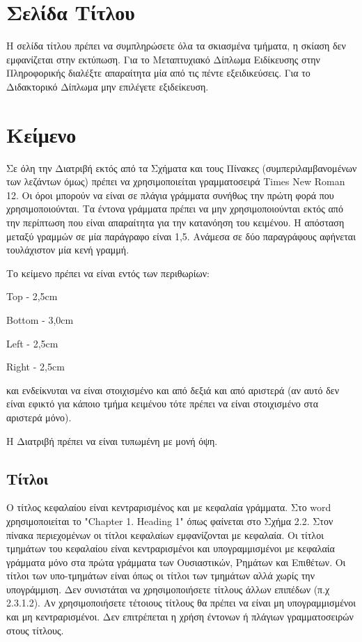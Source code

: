 \section{Σελίδα Τίτλου}
\label{sec:2.2}

Η σελίδα τίτλου πρέπει να συμπληρώσετε όλα τα σκιασμένα τμήματα, η
σκίαση δεν εμφανίζεται στην εκτύπωση. Για το Μεταπτυχιακό Δίπλωμα
Ειδίκευσης στην Πληροφορικής διαλέξτε απαραίτητα μία από τις πέντε
εξειδικεύσεις. Για το Διδακτορικό Δίπλωμα μην επιλέγετε
εξιδείκευση.


\section{Κείμενο}
\label{sec:2.3}

Σε όλη την Διατριβή εκτός από τα Σχήματα και τους Πίνακες
(συμπεριλαμβανομένων των λεζάντων όμως) πρέπει να χρησιμοποιείται
γραμματοσειρά Times New Roman 12. Οι όροι μπορούν να είναι σε
πλάγια γράμματα συνήθως την πρώτη φορά που χρησιμοποιούνται. Τα
έντονα γράμματα πρέπει να μην χρησιμοποιούνται εκτός από την
περίπτωση που είναι απαραίτητα για την κατανόηση του κειμένου. Η
απόσταση μεταξύ γραμμών σε μία παράγραφο είναι 1,5. Ανάμεσα σε δύο
παραγράφους αφήνεται τουλάχιστον μία κενή γραμμή.

\y Το κείμενο πρέπει να είναι εντός των περιθωρίων:

\chl Top - 2,5cm

\chl Bottom - 3,0cm

\chl Left - 2,5cm

\chl Right - 2,5cm

\chl και ενδείκνυται να είναι στοιχισμένο και από δεξιά και από
αριστερά (αν αυτό δεν είναι εφικτό για κάποιο τμήμα κειμένου τότε
πρέπει να είναι στοιχισμένο στα αριστερά μόνο).

Η Διατριβή πρέπει να είναι τυπωμένη με μονή όψη.


\subsection{Τίτλοι} \label{sec:2.3.1}

Ο τίτλος κεφαλαίου είναι κεντραρισμένος και με κεφαλαία γράμματα.
Στο word χρησιμοποιείται το "Chapter 1. Heading 1" όπως φαίνεται
στο Σχήμα 2.2.  Στον πίνακα περιεχομένων οι τίτλοι κεφαλαίων
εμφανίζονται με κεφαλαία. Οι τίτλοι τμημάτων του κεφαλαίου είναι
κεντραρισμένοι και υπογραμμισμένοι με κεφαλαία γράμματα μόνο στα
πρώτα γράμματα των Ουσιαστικών, Ρημάτων και Επιθέτων. Οι τίτλοι
των υπο-τμημάτων είναι όπως οι τίτλοι των τμημάτων αλλά χωρίς την
υπογράμμιση. Δεν συνιστάται να χρησιμοποιήσετε τίτλους άλλων
επιπέδων (π.χ 2.3.1.2). Αν χρησιμοποιήσετε τέτοιους τίτλους θα
πρέπει να είναι μη υπογραμμισμένοι και μη κεντραρισμένοι. Δεν
επιτρέπεται η χρήση έντονων ή πλάγιων γραμματοσειρών στους
τίτλους.

